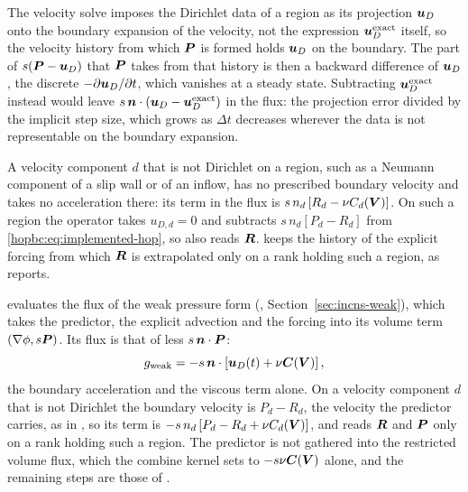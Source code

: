 The velocity solve imposes the Dirichlet data of a region as its projection
\(\boldsymbol{u}_D\) onto the boundary expansion of the velocity, not the expression
\(\boldsymbol{u}_D^{\mathrm{exact}}\) itself, so the velocity history from which
\(\boldsymbol{P}\) is formed holds \(\boldsymbol{u}_D\) on the boundary. The part of
\(s(\boldsymbol{P}-\boldsymbol{u}_D)\) that \(\boldsymbol{P}\) takes from that history is then a
backward difference of \(\boldsymbol{u}_D\), the discrete
\(-\partial\boldsymbol{u}_D/\partial t\), which vanishes at a steady state.
Subtracting \(\boldsymbol{u}_D^{\mathrm{exact}}\) instead would leave
\(s\,\boldsymbol{n}\cdot(\boldsymbol{u}_D-\boldsymbol{u}_D^{\mathrm{exact}})\) in the flux: the
projection error divided by the implicit step size, which grows as
\(\Delta t\) decreases wherever the data is not representable on the
boundary expansion.

A velocity component \(d\) that is not Dirichlet on a region, such as a
Neumann component of a slip wall or of an inflow, has no prescribed boundary
velocity and takes no acceleration there: its term in the flux is
\(s\,n_d\left[R_d-\nu C_d(\boldsymbol{V})\right]\). On such a region the operator
takes \(u_{D,d}=0\) and subtracts \(s\,n_d\left[P_d-R_d\right]\) from
\eqref{hopbc:eq:implemented-hop}, so  also reads
\(\boldsymbol{R}\).  keeps the history of the
explicit forcing from which \(\boldsymbol{R}\) is extrapolated only on a rank
holding such a region, as  reports.

 evaluates the flux of the weak pressure form
(, Section~\ref{sec:incns-weak}), which takes
the predictor, the explicit advection and the forcing into its volume term
\((\nabla\phi,s\boldsymbol{P})\). Its flux is that of 
less \(s\,\boldsymbol{n}\cdot\boldsymbol{P}\):
\begin{equation}
  g_{\mathrm{weak}}=-s\,\boldsymbol{n}\cdot
    \left[\boldsymbol{u}_D(t)+\nu\boldsymbol{C}(\boldsymbol{V})\right],
  \label{hopbc:eq:weak-hop}
\end{equation}
the boundary acceleration and the viscous term alone. On a velocity component
\(d\) that is not Dirichlet the boundary velocity is \(P_d-R_d\), the velocity
the predictor carries, as in , so its term is
\(-s\,n_d\left[P_d-R_d+\nu C_d(\boldsymbol{V})\right]\), and 
reads \(\boldsymbol{R}\) and \(\boldsymbol{P}\) only on a rank holding such a region. The
predictor is not gathered into the restricted volume flux, which the combine
kernel sets to \(-s\nu\boldsymbol{C}(\boldsymbol{V})\) alone, and the remaining steps are
those of .

